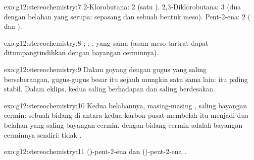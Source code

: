 \begin{solution}{exo:g12:stereochemistry:7}
2-Klorobutana: 2 (satu ). 2,3-Diklorobutana: 3 (dua
 dengan belahan yang serupa: sepasang  dan
sebuah bentuk meso). Pent-2-ena: 2 ( dan ).
\end{solution}

\begin{solution}{exo:g12:stereochemistry:8}
; ; ;  yang sama (asam
meso-tartrat dapat di\-tumpang\-tindih\-kan dengan bayangan cerminnya).
\end{solution}

\begin{solution}{exo:g12:stereochemistry:9}
Dalam  goyang dengan gugus  yang saling
berseberangan, gugus-gugus besar itu sejauh mungkin satu sama lain:
 itu paling stabil. Dalam  eklips, kedua 
saling berhadapan dan saling berdesakan.
\end{solution}

\begin{solution}{exo:g12:stereochemistry:10}
Kedua belahannya, masing-masing , saling bayangan
cermin: sebuah bidang di antara kedua karbon pusat membelah  itu
menjadi dua belahan yang saling bayangan cermin.  dengan bidang
cermin adalah bayangan cerminnya sendiri: tidak .
\end{solution}

\begin{solution}{exo:g12:stereochemistry:11}
()-pent-2-ena 
dan ()-pent-2-ena .
\end{solution}

